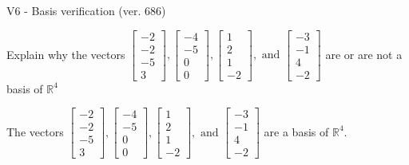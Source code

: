 \begin{exercise}
  \begin{exerciseTitle}V6 - Basis verification (ver. 686)\end{exerciseTitle}
  \begin{exerciseStatement}
    Explain why the vectors \(\left[\begin{array}{r}
-2 \\
-2 \\
-5 \\
3
\end{array}\right] , \left[\begin{array}{r}
-4 \\
-5 \\
0 \\
0
\end{array}\right] , \left[\begin{array}{r}
1 \\
2 \\
1 \\
-2
\end{array}\right] , \text{ and } \left[\begin{array}{r}
-3 \\
-1 \\
4 \\
-2
\end{array}\right]\) are or are not a basis of \(\mathbb{R}^4\)	


  \end{exerciseStatement}
  \begin{exerciseAnswer}
   The vectors \(\left[\begin{array}{r}
-2 \\
-2 \\
-5 \\
3
\end{array}\right] , \left[\begin{array}{r}
-4 \\
-5 \\
0 \\
0
\end{array}\right] , \left[\begin{array}{r}
1 \\
2 \\
1 \\
-2
\end{array}\right] , \text{ and } \left[\begin{array}{r}
-3 \\
-1 \\
4 \\
-2
\end{array}\right]\) 
  	 are  a basis of \(\mathbb{R}^4\).
  


  \end{exerciseAnswer}
\end{exercise}